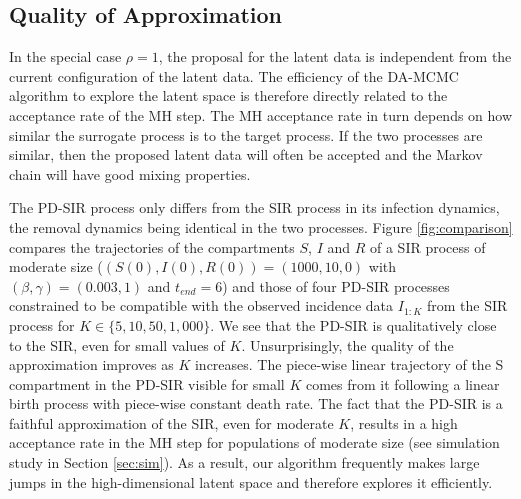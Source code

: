 \documentclass[11pt]{article}
\newcommand{\jx}[1]{{\color{blue}{ #1}}}
\begin{document}
		\jx{We may insert a brief note explicitly contrasting with previous single-site RJMCMC work (ref), giving a bit of intuition why we are able to avoid that change of space, and this could be a natural place to put it. Then, they also have a little more context for the experiment you've since added} 
	
	\subsection{Quality of Approximation}
	\label{sec:qua}
	
	In the special case $\rho=1$, the proposal for the latent data is independent from the current configuration of the latent data. The efficiency of the DA-MCMC algorithm to explore the latent space is therefore directly related to the acceptance rate of the MH step. The MH acceptance rate in turn depends on how similar the surrogate process is to the target process. If the two processes are similar, then the proposed latent data will often be accepted and the Markov chain will have good mixing properties.
	
	The PD-SIR process only differs from the SIR process in its infection dynamics, the removal dynamics being identical in the two processes. Figure \ref{fig:comparison} compares the trajectories of the compartments $S$, $I$ and $R$ of a SIR process of moderate size ($(S(0), I(0), R(0)) = (1000, 10, 0)$ with $(\beta, \gamma) = (0.003, 1)$ and $t_{end} = 6$) and those of four PD-SIR processes constrained to be compatible with the observed incidence data $I_{1:K}$ from the SIR process for $K \in \{5, 10, 50, 1,000\}$. We see that the PD-SIR is qualitatively close to the SIR, even for small values of $K$. Unsurprisingly, the quality of the approximation improves as $K$ increases. The piece-wise linear trajectory of the S compartment in the PD-SIR visible for small $K$ comes from it following a linear birth process with piece-wise constant death rate.
	The fact that the PD-SIR is a faithful approximation of the SIR, even for moderate $K$, results in a high acceptance rate in the MH step for populations of moderate size (see simulation study in Section \ref{sec:sim}). As a result, our algorithm frequently makes large jumps in the high-dimensional latent space and therefore explores it efficiently. 
	
\end{document}
